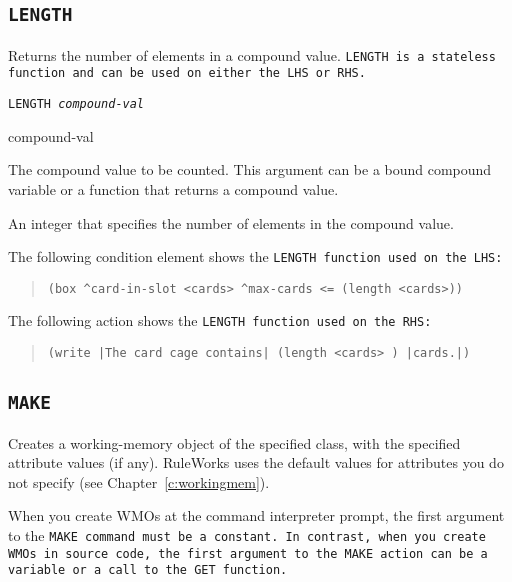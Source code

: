 \subsection{\tt{LENGTH}}

Returns the number of elements in a compound value. \tt{LENGTH} is a
stateless function and can be used on either the LHS or RHS.

\Format

\tt{LENGTH} \it{compound-val}

\begin{arguments}
\item[compound-val]

  The compound value to be counted. This argument can be a bound
  compound variable or a function that returns a compound value.
\end{arguments}

\ReturnValue

An integer that specifies the number of elements in the
compound value.

\Example

The following condition element shows the \tt{LENGTH} function used on
the LHS:

\begin{quote}
\begin{verbatim}
(box ^card-in-slot <cards> ^max-cards <= (length <cards>))
\end{verbatim}
\end{quote}

The following action shows the \tt{LENGTH} function used on the RHS:

\begin{quote}
\begin{verbatim}
(write |The card cage contains| (length <cards> ) |cards.|)
\end{verbatim}
\end{quote}

\subsection{\tt{MAKE}}

Creates a working-memory object of the specified class, with the
specified attribute values (if any). RuleWorks uses the default values
for attributes you do not specify (see Chapter~\ref{c:workingmem}).

\begin{note}
  When you create WMOs at the command interpreter prompt, the first
  argument to the \tt{MAKE} command must be a constant. In contrast,
  when you create WMOs in source code, the first argument to the
  \tt{MAKE} action can be a variable or a call to the \tt{GET}
  function.
\end{note}

